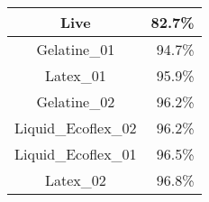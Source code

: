\begin{tabular}{ c   r }
    Live                & 82.7\% \\  \hline\hline
    Gelatine\_01        & 94.7\% \\
    Latex\_01           & 95.9\% \\
    Gelatine\_02        & 96.2\% \\
    Liquid\_Ecoflex\_02 & 96.2\% \\
    Liquid\_Ecoflex\_01 & 96.5\% \\
    Latex\_02           & 96.8\% \\
\end{tabular}
